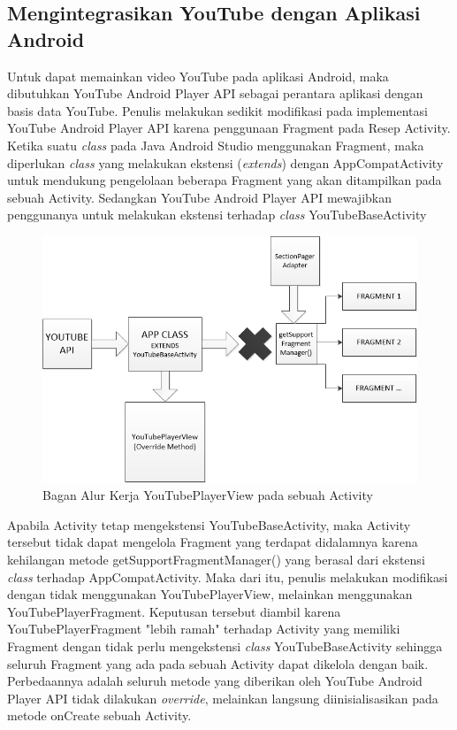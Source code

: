 	\subsection{Mengintegrasikan YouTube dengan Aplikasi Android}
		 Untuk dapat memainkan video YouTube pada aplikasi Android, maka dibutuhkan YouTube Android Player API sebagai perantara aplikasi dengan basis data YouTube. Penulis melakukan sedikit modifikasi pada implementasi YouTube Android Player API karena penggunaan Fragment pada Resep Activity. Ketika suatu \textit{class} pada Java Android Studio menggunakan Fragment, maka diperlukan \textit{class} yang melakukan ekstensi (\textit{extends}) dengan AppCompatActivity untuk mendukung pengelolaan beberapa Fragment yang akan ditampilkan pada sebuah Activity. Sedangkan YouTube Android Player API mewajibkan penggunanya untuk melakukan ekstensi terhadap \textit{class} YouTubeBaseActivity
 		\begin{figure}[H]
		 	\centering
		 	\includegraphics[width=1\textwidth]{gambar/new/youtube_player_view}
		 	\caption{Bagan Alur Kerja YouTubePlayerView pada sebuah Activity}
		 	\label{youtube-player-view}
		 \end{figure}
		\vspace{1cm}
		Apabila Activity tetap mengekstensi YouTubeBaseActivity, maka Activity tersebut tidak dapat mengelola Fragment yang terdapat didalamnya karena kehilangan metode getSupportFragmentManager() yang berasal dari ekstensi \textit{class} terhadap AppCompatActivity. Maka dari itu, penulis melakukan modifikasi dengan tidak menggunakan YouTubePlayerView, melainkan menggunakan YouTubePlayerFragment. Keputusan tersebut diambil karena YouTubePlayerFragment "lebih ramah" terhadap Activity yang memiliki Fragment dengan tidak perlu mengekstensi \textit{class} YouTubeBaseActivity sehingga seluruh Fragment yang ada pada sebuah Activity dapat dikelola dengan baik. Perbedaannya adalah seluruh metode yang diberikan oleh YouTube Android Player API tidak dilakukan \textit{override}, melainkan langsung diinisialisasikan pada metode onCreate sebuah Activity. 
